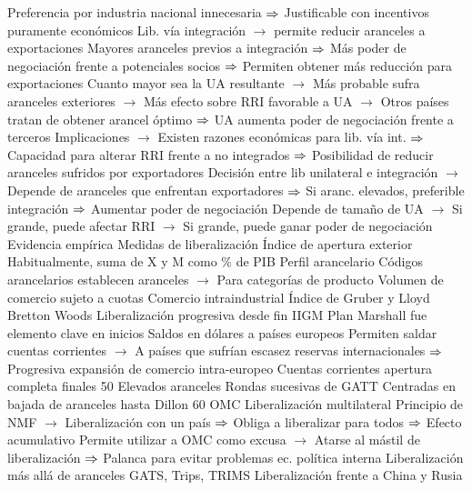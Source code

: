 \documentclass{nuevotema}
\begin{document}
\begin{esquemal}
				\4[] Preferencia por industria nacional innecesaria
				\4[] $\Rightarrow$ Justificable con incentivos puramente económicos
				\4[] Lib. vía integración
				\4[] $\to$ permite reducir aranceles a exportaciones
				\4[] Mayores aranceles previos a integración
				\4[] $\Rightarrow$ Más poder de negociación frente a potenciales socios
				\4[] $\Rightarrow$ Permiten obtener más reducción para exportaciones
				\4[] Cuanto mayor sea la UA resultante
				\4[] $\to$ Más probable sufra aranceles exteriores
				\4[] $\to$ Más efecto sobre RRI favorable a UA
				\4[] $\to$ Otros países tratan de obtener arancel óptimo
				\4[] $\Rightarrow$ UA aumenta poder de negociación frente a terceros
				\4 Implicaciones
				\4[] $\to$ Existen razones económicas para lib. vía int.
				\4[] $\Rightarrow$ Capacidad para alterar RRI frente a no integrados
				\4[] $\Rightarrow$ Posibilidad de reducir aranceles sufridos por exportadores
				\4[] Decisión entre lib unilateral e integración
				\4[] $\to$ Depende de aranceles que enfrentan exportadores
				\4[] $\Rightarrow$ Si aranc. elevados, preferible integración
				\4[] $\Rightarrow$ Aumentar poder de negociación
				\4[] Depende de tamaño de UA
				\4[] $\to$ Si grande, puede afectar RRI
				\4[] $\to$ Si grande, puede ganar poder de negociación
		\2 Evidencia empírica
			\3 Medidas de liberalización
				\4 Índice de apertura exterior
				\4[] Habitualmente, suma de X y M como \% de PIB
				\4 Perfil arancelario
				\4[] Códigos arancelarios establecen aranceles
				\4[] $\to$ Para categorías de producto
				\4 Volumen de comercio sujeto a cuotas
				\4 Comercio intraindustrial
				\4[] Índice de Gruber y Lloyd
			\3 Bretton Woods
				\4 Liberalización progresiva desde fin IIGM
				\4 Plan Marshall fue elemento clave en inicios
				\4[] Saldos en dólares a países europeos
				\4[] Permiten saldar cuentas corrientes
				\4[] $\to$ A países que sufrían escasez reservas internacionales
				\4[] $\Rightarrow$ Progresiva expansión de comercio intra-europeo
				\4 Cuentas corrientes apertura completa finales 50
				\4[] Elevados aranceles
				\4 Rondas sucesivas de GATT
				\4[] Centradas en bajada de aranceles hasta Dillon 60
			\3 OMC
				\4 Liberalización multilateral
				\4[] Principio de NMF
				\4[] $\to$ Liberalización con un país
				\4[] $\Rightarrow$ Obliga a liberalizar para todos
				\4[] $\Rightarrow$ Efecto acumulativo
				\4[] Permite utilizar a OMC como excusa
				\4[] $\to$ Atarse al mástil de liberalización
				\4[] $\Rightarrow$ Palanca para evitar problemas ec. política interna
				\4 Liberalización más allá de aranceles
				\4[] GATS, Trips, TRIMS
				\4 Liberalización frente a China y Rusia

\end{esquemal}
\end{document}
